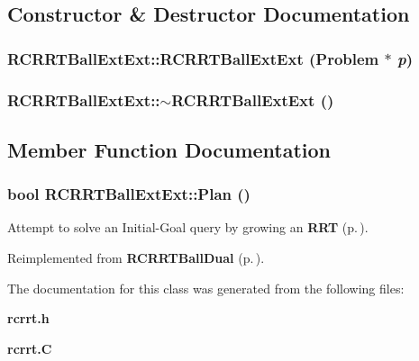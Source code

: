 \subsection{Constructor \& Destructor Documentation}
\subsubsection{\setlength{\rightskip}{0pt plus 5cm}RCRRTBall\-Ext\-Ext::RCRRTBall\-Ext\-Ext ({\bf Problem} $\ast$ {\em p})}\label{classRCRRTBallExtExt_a0}


\subsubsection{\setlength{\rightskip}{0pt plus 5cm}RCRRTBall\-Ext\-Ext::$\sim$RCRRTBall\-Ext\-Ext ()\hspace{0.3cm}{\tt  [inline, virtual]}}\label{classRCRRTBallExtExt_a1}




\subsection{Member Function Documentation}
\subsubsection{\setlength{\rightskip}{0pt plus 5cm}bool RCRRTBall\-Ext\-Ext::Plan ()\hspace{0.3cm}{\tt  [virtual]}}\label{classRCRRTBallExtExt_a2}


Attempt to solve an Initial-Goal query by growing an {\bf RRT} {\rm (p.\,\pageref{classRRT})}.



Reimplemented from {\bf RCRRTBall\-Dual} {\rm (p.\,\pageref{classRCRRTBallDual_a2})}.

The documentation for this class was generated from the following files:\begin{CompactItemize}
\item 
{\bf rcrrt.h}\item 
{\bf rcrrt.C}\end{CompactItemize}
